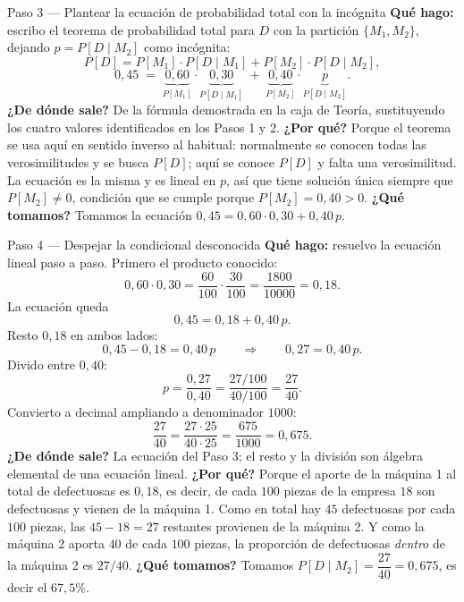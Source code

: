 \documentclass[11pt]{article}
\begin{document}
\begin{sol}
\begin{paso}{Paso 3 --- Plantear la ecuaci\'on de probabilidad total con la inc\'ognita}
\textbf{Qu\'e hago:} escribo el teorema de probabilidad total para $D$ con la partici\'on $\{M_1,M_2\}$, dejando $p=P[D\mid M_2]$ como inc\'ognita:
\[
P[D]=P[M_1]\cdot P[D\mid M_1]+P[M_2]\cdot P[D\mid M_2],
\]
\[
0{,}45 \;=\; \underbrace{0{,}60}_{P[M_1]}\cdot\underbrace{0{,}30}_{P[D\mid M_1]} \;+\; \underbrace{0{,}40}_{P[M_2]}\cdot\underbrace{p}_{P[D\mid M_2]} .
\]
\textbf{¿De d\'onde sale?} De la f\'ormula demostrada en la caja de Teor\'ia, sustituyendo los cuatro valores identificados en los Pasos 1 y 2.
\textbf{¿Por qu\'e?} Porque el teorema se usa aqu\'i en sentido inverso al habitual: normalmente se conocen todas las verosimilitudes y se busca $P[D]$; aqu\'i se conoce $P[D]$ y falta una verosimilitud. La ecuaci\'on es la misma y es lineal en $p$, as\'i que tiene soluci\'on \'unica siempre que $P[M_2]\neq 0$, condici\'on que se cumple porque $P[M_2]=0{,}40>0$.
\textbf{¿Qu\'e tomamos?} Tomamos la ecuaci\'on $0{,}45=0{,}60\cdot 0{,}30+0{,}40\,p$.
\end{paso}

\begin{paso}{Paso 4 --- Despejar la condicional desconocida}
\textbf{Qu\'e hago:} resuelvo la ecuaci\'on lineal paso a paso. Primero el producto conocido:
\[
0{,}60\cdot 0{,}30=\frac{60}{100}\cdot\frac{30}{100}=\frac{1800}{10000}=0{,}18 .
\]
La ecuaci\'on queda
\[
0{,}45=0{,}18+0{,}40\,p .
\]
Resto $0{,}18$ en ambos lados:
\[
0{,}45-0{,}18=0{,}40\,p
\qquad\Longrightarrow\qquad
0{,}27=0{,}40\,p .
\]
Divido entre $0{,}40$:
\[
p=\frac{0{,}27}{0{,}40}=\frac{27/100}{40/100}=\frac{27}{40}.
\]
Convierto a decimal ampliando a denominador $1000$:
\[
\frac{27}{40}=\frac{27\cdot 25}{40\cdot 25}=\frac{675}{1000}=0{,}675 .
\]
\textbf{¿De d\'onde sale?} La ecuaci\'on del Paso 3; el resto y la divisi\'on son \'algebra elemental de una ecuaci\'on lineal.
\textbf{¿Por qu\'e?} Porque el aporte de la m\'aquina 1 al total de defectuosas es $0{,}18$, es decir, de cada $100$ piezas de la empresa $18$ son defectuosas y vienen de la m\'aquina 1. Como en total hay $45$ defectuosas por cada $100$ piezas, las $45-18=27$ restantes provienen de la m\'aquina 2. Y como la m\'aquina 2 aporta $40$ de cada $100$ piezas, la proporci\'on de defectuosas \emph{dentro} de la m\'aquina 2 es $27/40$.
\textbf{¿Qu\'e tomamos?} Tomamos $P[D\mid M_2]=\dfrac{27}{40}=0{,}675$, es decir el $67{,}5\%$.
\end{paso}


\end{sol}
\end{document}
